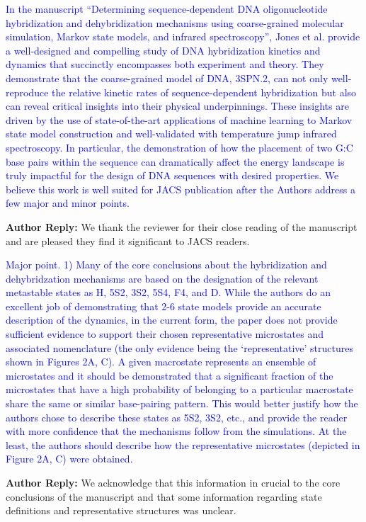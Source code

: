 \documentclass[11pt,a4paper]{letter} %
\begin{document}
\textcolor{blue}{In the manuscript “Determining sequence-dependent DNA oligonucleotide hybridization and dehybridization mechanisms using coarse-grained molecular simulation, Markov state models, and infrared spectroscopy”, Jones et al. provide a well-designed and compelling study of DNA hybridization kinetics and dynamics that succinctly encompasses both experiment and theory. They demonstrate that the coarse-grained model of DNA, 3SPN.2, can not only well-reproduce the relative kinetic rates of sequence-dependent hybridization but also can reveal critical insights into their physical underpinnings. These insights are driven by the use of state-of-the-art applications of machine learning to Markov state model construction and well-validated with temperature jump infrared spectroscopy. In particular, the demonstration of how the placement of two G:C base pairs within the sequence can dramatically affect the energy landscape is truly impactful for the design of DNA sequences with desired properties. We believe this work is well suited for JACS publication after the Authors address a few major and minor points.}

\textbf{Author Reply:}   We thank the reviewer for their close reading of the manuscript and are pleased they find it significant to JACS readers.

\textcolor{blue}{Major point.
1)      Many of the core conclusions about the hybridization and dehybridzation mechanisms are based on the designation of the relevant metastable states as H, 5S2, 3S2, 5S4, F4, and D. While the authors do an excellent job of demonstrating that 2-6 state models provide an accurate description of the dynamics, in the current form, the paper does not provide sufficient evidence to support their chosen representative microstates and associated nomenclature (the only evidence being the ‘representative’ structures shown in Figures 2A, C). A given macrostate represents an ensemble of microstates and it should be demonstrated that a significant fraction of the microstates that have a high probability of belonging to a particular macrostate share the same or similar base-pairing pattern. This would better justify how the authors chose to describe these states as 5S2, 3S2, etc., and provide the reader with more confidence that the mechanisms follow from the simulations. At the least, the authors should describe how the representative microstates (depicted in Figure 2A, C) were obtained.
}

\textbf{Author Reply:}   We acknowledge that this information in crucial to the core conclusions of the manuscript and that some information regarding state definitions and representative structures was unclear.
\end{document}
